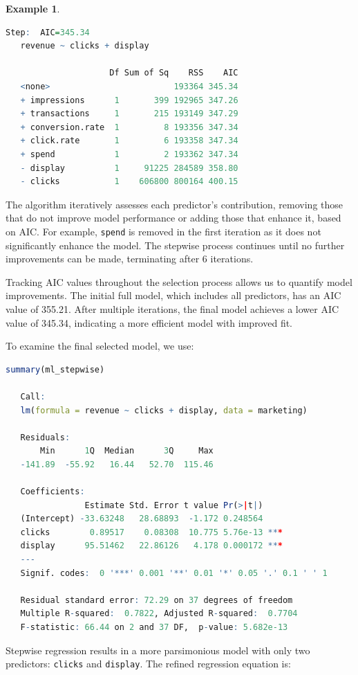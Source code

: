 \documentclass[
]{book}
\newcommand{\passthrough}[1]{#1}
\theoremstyle{definition}
\theoremstyle{definition}
\newtheorem{example}{Example}[chapter]
\theoremstyle{definition}
\theoremstyle{definition}
\theoremstyle{remark}
\begin{document}
\begin{example}
\begin{lstlisting}[language=R]
   Step:  AIC=345.34
   revenue ~ clicks + display
   
                     Df Sum of Sq    RSS    AIC
   <none>                         193364 345.34
   + impressions      1       399 192965 347.26
   + transactions     1       215 193149 347.29
   + conversion.rate  1         8 193356 347.34
   + click.rate       1         6 193358 347.34
   + spend            1         2 193362 347.34
   - display          1     91225 284589 358.80
   - clicks           1    606800 800164 400.15
\end{lstlisting}

The algorithm iteratively assesses each predictor's contribution, removing those that do not improve model performance or adding those that enhance it, based on AIC. For example, \passthrough{\lstinline!spend!} is removed in the first iteration as it does not significantly enhance the model. The stepwise process continues until no further improvements can be made, terminating after 6 iterations.

Tracking AIC values throughout the selection process allows us to quantify model improvements. The initial full model, which includes all predictors, has an AIC value of 355.21. After multiple iterations, the final model achieves a lower AIC value of 345.34, indicating a more efficient model with improved fit.

To examine the final selected model, we use:

\begin{lstlisting}[language=R]
summary(ml_stepwise)
   
   Call:
   lm(formula = revenue ~ clicks + display, data = marketing)
   
   Residuals:
       Min      1Q  Median      3Q     Max 
   -141.89  -55.92   16.44   52.70  115.46 
   
   Coefficients:
                Estimate Std. Error t value Pr(>|t|)    
   (Intercept) -33.63248   28.68893  -1.172 0.248564    
   clicks        0.89517    0.08308  10.775 5.76e-13 ***
   display      95.51462   22.86126   4.178 0.000172 ***
   ---
   Signif. codes:  0 '***' 0.001 '**' 0.01 '*' 0.05 '.' 0.1 ' ' 1
   
   Residual standard error: 72.29 on 37 degrees of freedom
   Multiple R-squared:  0.7822, Adjusted R-squared:  0.7704 
   F-statistic: 66.44 on 2 and 37 DF,  p-value: 5.682e-13
\end{lstlisting}

Stepwise regression results in a more parsimonious model with only two predictors: \passthrough{\lstinline!clicks!} and \passthrough{\lstinline!display!}. The refined regression equation is:


\end{example}
\end{document}
